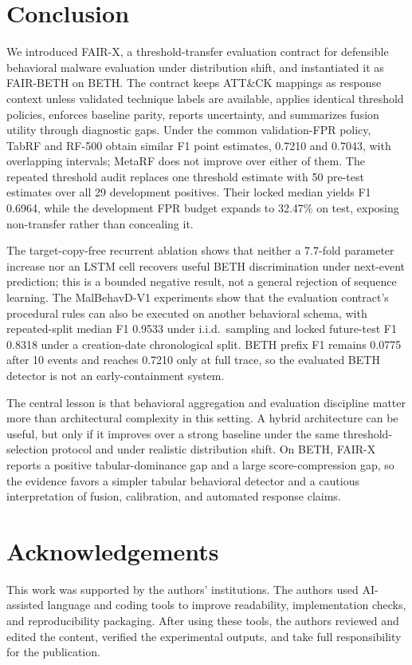 \documentclass[10pt,journal,compsoc]{IEEEtran}
\begin{document}
\section{Conclusion}
\label{sec:conclusion}

We introduced FAIR-X, a threshold-transfer evaluation contract for defensible behavioral malware evaluation under distribution shift, and instantiated it as FAIR-BETH on BETH. The contract keeps ATT\&CK mappings as response context unless validated technique labels are available, applies identical threshold policies, enforces baseline parity, reports uncertainty, and summarizes fusion utility through diagnostic gaps. Under the common validation-FPR policy, TabRF and RF-500 obtain similar F1 point estimates, 0.7210 and 0.7043, with overlapping intervals; MetaRF does not improve over either of them. The repeated threshold audit replaces one threshold estimate with 50 pre-test estimates over all 29 development positives. Their locked median yields F1 0.6964, while the development FPR budget expands to 32.47\% on test, exposing non-transfer rather than concealing it.

The target-copy-free recurrent ablation shows that neither a 7.7-fold parameter increase nor an LSTM cell recovers useful BETH discrimination under next-event prediction; this is a bounded negative result, not a general rejection of sequence learning. The MalBehavD-V1 experiments show that the evaluation contract's procedural rules can also be executed on another behavioral schema, with repeated-split median F1 0.9533 under i.i.d.\ sampling and locked future-test F1 0.8318 under a creation-date chronological split. BETH prefix F1 remains 0.0775 after 10 events and reaches 0.7210 only at full trace, so the evaluated BETH detector is not an early-containment system.

The central lesson is that behavioral aggregation and evaluation discipline matter more than architectural complexity in this setting. A hybrid architecture can be useful, but only if it improves over a strong baseline under the same threshold-selection protocol and under realistic distribution shift. On BETH, FAIR-X reports a positive tabular-dominance gap and a large score-compression gap, so the evidence favors a simpler tabular behavioral detector and a cautious interpretation of fusion, calibration, and automated response claims.

\section*{Acknowledgements}
This work was supported by the authors' institutions. The authors used AI-assisted language and coding tools to improve readability, implementation checks, and reproducibility packaging. After using these tools, the authors reviewed and edited the content, verified the experimental outputs, and take full responsibility for the publication.
\end{document}
